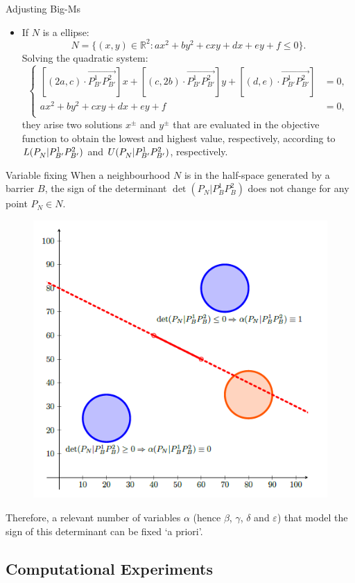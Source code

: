 \documentclass[slidestop,usepdftitle=false,10pt]{beamer}
\newcommand{\determinant}[3]{\det({#1|#2#3})}
\begin{document}
	\begin{frame}{Adjusting Big-Ms}
		\begin{itemize}
			\footnotesize
			\item If $N$ is a ellipse:
			$$N=\{(x,y)\in\mathbb R^2:ax^2+by^2+cxy+dx+ey+f\leq 0\}.$$
			Solving the quadratic system:
			$$
			\left\{\begin{array}{rl}
				\left[(2a, c)\cdot\overrightarrow{P^1_{B'}P^2_{B'}}\right]x+\left[(c, 2b)\cdot\overrightarrow{P^1_{B'}P^2_{B'}}\right]y+\left[(d, e)\cdot\overrightarrow{P^1_{B'}P^2_{B'}}\right]&=0,\\
				ax^2+by^2+cxy+dx+ey+f& =0,\\
			\end{array}\right.$$
			they arise two solutions $x^{\pm}$ and $y^{\pm}$ that are evaluated in the objective function to obtain the lowest and highest value, respectively, according to $L(P_N^{}|P_{B'}^1P_{B'}^2)$ and $U(P_N^{}|P_{B'}^1P_{B'}^2)$, respectively.
		\end{itemize}
	\end{frame}

	\begin{frame}{Variable fixing}
		\footnotesize
		When a neighbourhood $N$ is in the half-space generated by a barrier $B$, the sign of the determinant $\determinant{P_N}{P_B^1}{P_B^2}$ does not change for any point $P_N\in N$.
		
		\begin{figure}
			\includegraphics[width = 0.5\linewidth]{variable_fixing_htspn}
		\end{figure}
		Therefore, a relevant number of variables $\alpha$ (hence $\beta$, $\gamma$, $\delta$ and $\varepsilon$) that model the sign of this determinant can be fixed `a priori'.
	
	\end{frame}
	
	\subsection{Computational Experiments}
	
\end{document}
